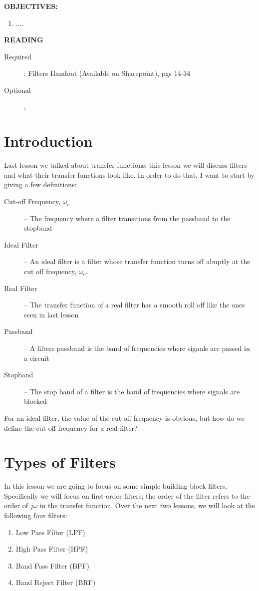\documentclass{handout}
\begin{document}
\maketitle

\textbf{OBJECTIVES:}
\begin{enumerate}
\item ....
\end{enumerate}

\textbf{READING}
\begin{description}
\item [Required]:
Filters Handout (Available on Sharepoint), pgs 14-34
\item [Optional]:
\end{description}

\section{Introduction}
Last lesson we talked about transfer functions; this lesson we will discuss filters and what their transfer functions look like.  In order to do that, I want to start by giving a few definitions:
\begin{description}
\item [Cut-off Frequency, $\omega_c$] -- The frequency where a filter transitions from the passband to the stopband
\item [Ideal Filter] -- An ideal filter is a filter whose transfer function turns off abuptly at the cut off frequency, $\omega_c$.
\item [Real Filter] -- The transfer function of a real filter has a smooth roll off like the ones seen in last lesson
\item [Passband] -- A filters passband is the band of frequencies where signals are passed in a circuit
\item [Stopband] -- The stop band of a filter is the band of frequencies where signals are blocked
\end{description}

For an ideal filter, the value of the cut-off frequency is obvious, but how do we define the cut-off frequency for a real filter?


\section{Types of Filters}
In this lesson we are going to focus on some simple building block filters.  Specifically we will focus on first-order filters; the order of the filter refers to the order of $j\omega$ in the transfer function.  Over the next two lessons, we will look at the following four filters:
\begin{enumerate}
\item Low Pass Filter (LPF)
\item High Pass Filter (HPF)
\item Band Pass Filter (BPF)
\item Band Reject Filter (BRF)
\end{enumerate}
\end{document}
